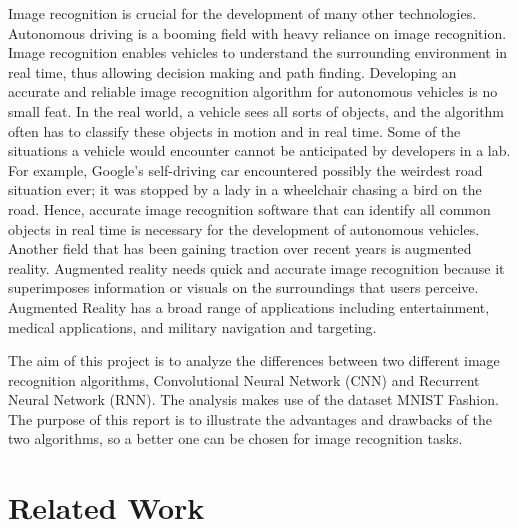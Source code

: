 \documentclass[letterpaper]{article} %
\begin{document}
 Image recognition is crucial for the development of many other technologies. Autonomous driving is a booming field with heavy reliance on image recognition. Image recognition enables vehicles to understand the surrounding environment in real time, thus allowing decision making and path finding. Developing an accurate and reliable image recognition algorithm for autonomous vehicles is no small feat. In the real world, a vehicle sees all sorts of objects, and the algorithm often has to classify these objects in motion and in real time. Some of the situations a vehicle would encounter cannot be anticipated by developers in a lab. For example, Google’s self-driving car encountered possibly the weirdest road situation ever; it was stopped by a lady in a wheelchair chasing a bird on the road. \cite{birdchasing2017} Hence, accurate image recognition software that can identify all common objects in real time is necessary for the development of autonomous vehicles. Another field that has been gaining traction over recent years is augmented reality. Augmented reality needs quick and accurate image recognition because it superimposes information or visuals on the surroundings that users perceive. Augmented Reality has a broad range of applications including entertainment, medical applications, and military navigation and targeting. \cite{ronald2006ar}

 The aim of this project is to analyze the differences between two different image recognition algorithms, Convolutional Neural Network (CNN) and Recurrent Neural Network (RNN). The analysis makes use of the dataset MNIST Fashion. The purpose of this report is to illustrate the advantages and drawbacks of the two algorithms, so a better one can be chosen for image recognition tasks.


\section{Related Work}
\end{document}
